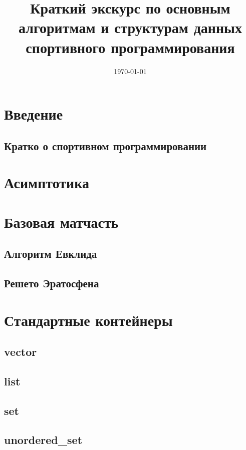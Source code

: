 \documentclass[a4paper,8pt]{article}
\begin{document}
\title{Краткий экскурс по основным алгоритмам и структурам данных спортивного программирования}
\date{\today}
\maketitle
\newpage
\tableofcontents
\newpage

\section{Введение}
    \subsection{Кратко о спортивном программировании}
\section{Асимптотика} 
\section{Базовая матчасть}
    
    
    
    
    \subsection{Алгоритм Евклида}
    \subsection{Решето Эратосфена}
\section{Стандартные контейнеры}
    \subsection{vector}
    \subsection{list}
    \subsection{set}
    \subsection{unordered\_set}
\end{document}
